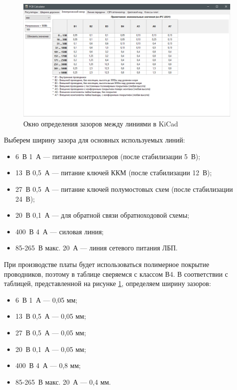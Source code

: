 \documentclass[utf8x, 14pt, oneside, a4paper]{article}
\begin{document}
		\begin{figure}[H]
			\centering
			\includegraphics[width=0.9\linewidth]{"Рисунки/KiCad-Calc-Z"}
			\caption{Окно определения зазоров между линиями в KiCad}
			\label{fig:kicad-calc-z}
		\end{figure}
	
		Выберем ширину зазора для основных используемых линий:
		
		\begin{itemize}
			\item 6~В 1~А --- питание контроллеров (после стабилизации 5~В);
			\item 13~В 0,5~А --- питание ключей ККМ (после стабилизации 12~В);
			\item 27~В 0,5~А --- питание ключей полумостовых схем (после стабилизации 24~В);
			\item 20~В 0,1~А --- для обратной связи обратноходовой схемы;
			\item 400~В 4~А --- силовая линия;
			\item 85-265~В макс. 20~А --- линия сетевого питания ЛБП.
		\end{itemize}
	
		При производстве платы будет использоваться полимерное покрытие проводников, поэтому в таблице сверяемся с классом В4. В соответствии с таблицей, представленной на рисунке \ref{fig:kicad-calc-z}, определяем ширину зазоров:
		
		\begin{itemize}
			\item 6~В 1~А --- 0,05 мм;
			\item 13~В 0,5~А --- 0,05 мм;
			\item 27~В 0,5~А --- 0,05 мм;
			\item 20~В 0,1~А --- 0,05 мм;
			\item 400~В 4~А --- 0,8 мм;
			\item 85-265~В макс. 20~А --- 0,4 мм.
		\end{itemize}
		
\end{document}

